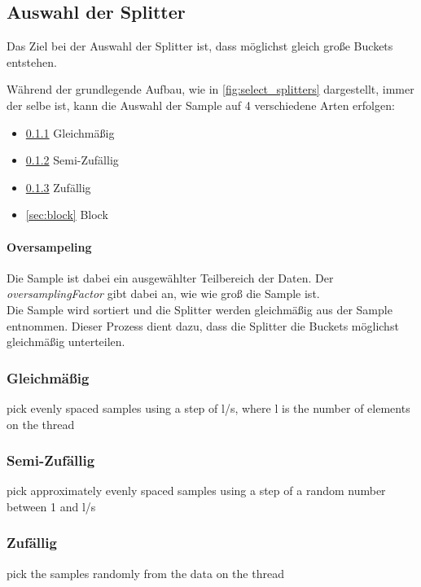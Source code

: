 	\subsection{Auswahl der Splitter}
		Das Ziel bei der Auswahl der Splitter ist, dass möglichst gleich große Buckets entstehen.
		
		Während der grundlegende Aufbau, wie in \ref{fig:select_splitters} dargestellt, immer der selbe ist, kann die Auswahl der Sample auf 4 verschiedene Arten erfolgen:
		\begin{itemize}
			\item \ref{sec:even} Gleichmäßig
			\item \ref{sec:semi-random} Semi-Zufällig
			\item \ref{sec:random} Zufällig
			\item \ref{sec:block} Block
		\end{itemize}
		
		\paragraph{Oversampeling}
			Die Sample ist dabei ein ausgewählter Teilbereich der Daten. Der \textit{oversamplingFactor} gibt dabei an, wie wie groß die Sample ist.\\
			Die Sample wird sortiert und die Splitter werden gleichmäßig aus der Sample entnommen.
			Dieser Prozess dient dazu, dass die Splitter die Buckets möglichst gleichmäßig unterteilen.
			
		\subsubsection{Gleichmäßig}
			\label{sec:even}
			pick evenly spaced samples using a step of l/s, where l is the number of elements on the thread

		\subsubsection{Semi-Zufällig}
			\label{sec:semi-random}
			pick approximately evenly spaced samples using a step of a random number between 1 and l/s

		\subsubsection{Zufällig}
			\label{sec:random}
			pick the samples randomly from the data on the thread

